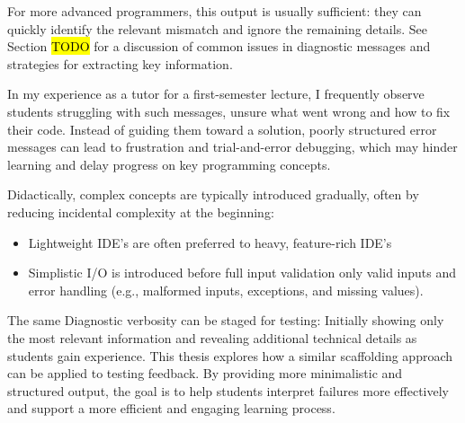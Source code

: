 \begin{justify}
\noindent For more advanced programmers, this output is usually sufficient: they can quickly identify the relevant mismatch and ignore the remaining details.
See Section \hl{TODO} for a discussion of common issues in diagnostic messages and strategies for extracting key information.

\skipM In my experience as a tutor for a first-semester lecture, I frequently observe students struggling with such messages, unsure what went wrong and how to fix their code.
Instead of guiding them toward a solution, poorly structured error messages can lead to frustration and trial-and-error debugging,
which may hinder learning and delay progress on key programming concepts.

\skipM Didactically, complex concepts are typically introduced gradually, often by reducing incidental complexity at the beginning:

\skipS\begin{itemize}[nosep]
    \item Lightweight IDE's are often preferred to heavy, feature-rich IDE's
    \item Simplistic I/O is introduced before full input validation only valid inputs and error handling (e.g., malformed inputs, exceptions, and missing values).
\end{itemize}

\skipS The same  Diagnostic verbosity can be staged for testing: Initially showing only the most relevant information and revealing additional technical details as students gain experience.
This thesis explores how a similar scaffolding approach can be applied to testing feedback. By providing more minimalistic and structured output,
the goal is to help students interpret failures more effectively and support a more efficient and engaging learning process.
\end{justify}









